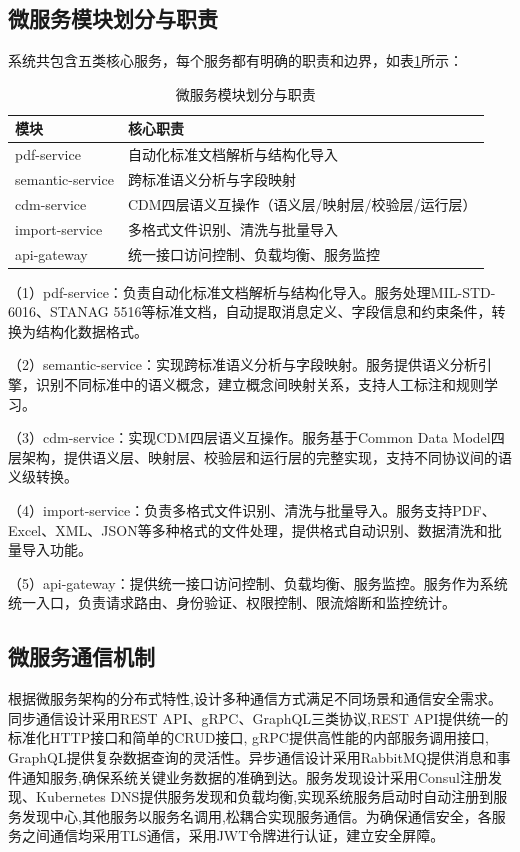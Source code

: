 \subsection{微服务模块划分与职责}

系统共包含五类核心服务，每个服务都有明确的职责和边界，如表\ref{table:microservices}所示：

\begin{table}[H]
    \caption{微服务模块划分与职责}
    \label{table:microservices}
    \centering
    \begin{tabular}{|l|l|}
        \hline
        \textbf{模块} & \textbf{核心职责} \\
        \hline
        pdf-service & 自动化标准文档解析与结构化导入 \\
        semantic-service & 跨标准语义分析与字段映射 \\
        cdm-service & CDM四层语义互操作（语义层/映射层/校验层/运行层） \\
        import-service & 多格式文件识别、清洗与批量导入 \\
        api-gateway & 统一接口访问控制、负载均衡、服务监控 \\
        \hline
    \end{tabular}
\end{table}

（1）pdf-service：负责自动化标准文档解析与结构化导入。服务处理MIL-STD-6016、STANAG 5516等标准文档，自动提取消息定义、字段信息和约束条件，转换为结构化数据格式。

（2）semantic-service：实现跨标准语义分析与字段映射。服务提供语义分析引擎，识别不同标准中的语义概念，建立概念间映射关系，支持人工标注和规则学习。

（3）cdm-service：实现CDM四层语义互操作。服务基于Common Data Model四层架构，提供语义层、映射层、校验层和运行层的完整实现，支持不同协议间的语义级转换。

（4）import-service：负责多格式文件识别、清洗与批量导入。服务支持PDF、Excel、XML、JSON等多种格式的文件处理，提供格式自动识别、数据清洗和批量导入功能。

（5）api-gateway：提供统一接口访问控制、负载均衡、服务监控。服务作为系统统一入口，负责请求路由、身份验证、权限控制、限流熔断和监控统计。

\subsection{微服务通信机制}

根据微服务架构的分布式特性,设计多种通信方式满足不同场景和通信安全需求。同步通信设计采用REST API、gRPC、GraphQL三类协议,REST API提供统一的标准化HTTP接口和简单的CRUD接口, gRPC提供高性能的内部服务调用接口, GraphQL提供复杂数据查询的灵活性。异步通信设计采用RabbitMQ提供消息和事件通知服务,确保系统关键业务数据的准确到达。服务发现设计采用Consul注册发现、Kubernetes DNS提供服务发现和负载均衡,实现系统服务启动时自动注册到服务发现中心,其他服务以服务名调用,松耦合实现服务通信。为确保通信安全，各服务之间通信均采用TLS通信，采用JWT令牌进行认证，建立安全屏障。

